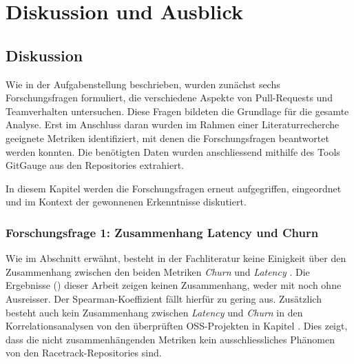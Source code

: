 


\chapter{Diskussion und Ausblick} %

\label{Chapter5} %


\section{Diskussion}
Wie in der Aufgabenstellung beschrieben, wurden zunächst sechs Forschungsfragen formuliert, die verschiedene Aspekte von Pull-Requests und Teamverhalten untersuchen. Diese Fragen bildeten die Grundlage für die gesamte Analyse. Erst im Anschluss daran wurden im Rahmen einer Literaturrecherche geeignete Metriken identifiziert, mit denen die Forschungsfragen beantwortet werden konnten. Die benötigten Daten wurden anschliessend mithilfe des Tools GitGauge aus den Repositories extrahiert.

In diesem Kapitel werden die Forschungsfragen erneut aufgegriffen, eingeordnet und im Kontext der gewonnenen Erkenntnisse diskutiert.



\subsection{Forschungsfrage 1: Zusammenhang Latency und Churn}
Wie im Abschnitt  erwähnt, besteht in der Fachliteratur keine Einigkeit über den Zusammenhang zwischen den beiden Metriken \textit{Churn} und \textit{Latency} \parencite{yu_wait_2015}\parencite{hasan_understanding_2023}\parencite{kudrjavets_small_2022}.
Die Ergebnisse () dieser Arbeit zeigen keinen Zusammenhang, weder mit noch ohne Ausreisser. Der Spearman-Koeffizient fällt hierfür zu gering aus. 
Zusätzlich besteht auch kein Zusammenhang zwischen \textit{Latency} und \textit{Churn} in den Korrelationsanalysen von den überprüften OSS-Projekten in Kapitel . Dies zeigt, dass die nicht zusammenhängenden Metriken kein ausschliessliches Phänomen von den Racetrack-Repositories sind.

